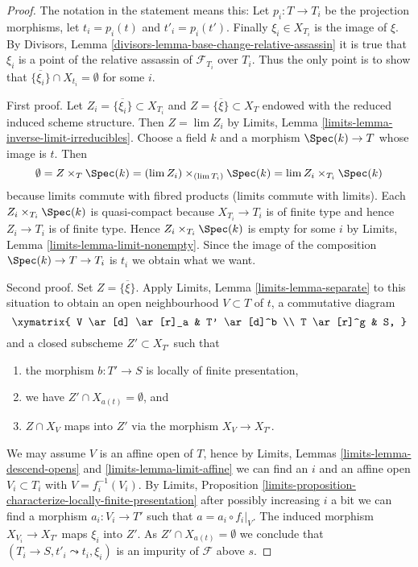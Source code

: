 \begin{proof}
The notation in the statement means this: Let $p_i : T \to T_i$
be the projection morphisms, let $t_i = p_i(t)$ and $t'_i = p_i(t')$.
Finally $\xi_i \in X_{T_i}$ is the image of $\xi$. By
Divisors, Lemma \ref{divisors-lemma-base-change-relative-assassin}
it is true that $\xi_i$ is a point of the relative
assassin of $\mathcal{F}_{T_i}$ over $T_i$. Thus the only point is to
show that $\overline{\{\xi_i\}} \cap X_{t_i} = \emptyset$ for some $i$.

\medskip\noindent
First proof. Let $Z_i = \overline{\{\xi_i\}} \subset X_{T_i}$
and $Z = \overline{\{\xi\}} \subset X_T$
endowed with the reduced induced scheme structure.
Then $Z = \lim Z_i$ by
Limits, Lemma \ref{limits-lemma-inverse-limit-irreducibles}.
Choose a field $k$ and a morphism $\Spec(k) \to T$ whose image is $t$.
Then
$$
\emptyset =
Z \times_T \Spec(k) = (\lim Z_i) \times_{(\lim T_i)} \Spec(k)
= \lim Z_i \times_{T_i} \Spec(k)
$$
because limits commute with fibred products (limits commute with limits).
Each $Z_i \times_{T_i} \Spec(k)$ is quasi-compact because $X_{T_i} \to T_i$
is of finite type and hence $Z_i \to T_i$ is of finite type.
Hence $Z_i \times_{T_i} \Spec(k)$ is empty for some $i$ by
Limits, Lemma \ref{limits-lemma-limit-nonempty}.
Since the image of the composition $\Spec(k) \to T \to T_i$ is $t_i$
we obtain what we want.

\medskip\noindent
Second proof. Set $Z = \overline{\{\xi\}}$. Apply
Limits, Lemma \ref{limits-lemma-separate}
to this situation to obtain an open neighbourhood
$V \subset T$ of $t$, a commutative diagram
$$
\xymatrix{
V \ar[d] \ar[r]_a & T' \ar[d]^b \\
T \ar[r]^g & S,
}
$$
and a closed subscheme $Z' \subset X_{T'}$ such that
\begin{enumerate}
\item the morphism $b : T' \to S$ is locally of finite presentation,
\item we have $Z' \cap X_{a(t)} = \emptyset$, and
\item $Z \cap X_V$ maps into $Z'$ via the morphism $X_V \to X_{T'}$.
\end{enumerate}
We may assume $V$ is an affine open of $T$, hence by
Limits, Lemmas \ref{limits-lemma-descend-opens} and
\ref{limits-lemma-limit-affine}
we can find an $i$ and an affine open $V_i \subset T_i$ with
$V = f_i^{-1}(V_i)$. By
Limits,
Proposition \ref{limits-proposition-characterize-locally-finite-presentation}
after possibly increasing $i$ a bit we can find a morphism
$a_i : V_i \to T'$ such that $a = a_i \circ f_i|_V$.
The induced morphism $X_{V_i} \to X_{T'}$ maps $\xi_i$ into
$Z'$. As $Z' \cap X_{a(t)} = \emptyset$ we conclude that
$(T_i \to S, t'_i \leadsto t_i, \xi_i)$ is an impurity of
$\mathcal{F}$ above $s$.
\end{proof}

